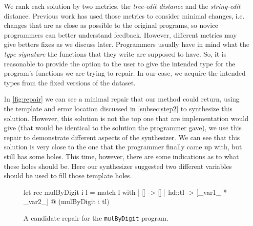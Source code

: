  We rank each solution by two metrics, the \emph{tree-edit distance} and the \emph{string-edit}
distance. Previous work has used those metrics to consider minimal changes, i.e. changes that are as close as possible
to the original programs, so novice programmers can better understand feedback. However, different metrics may give
betters fixes as we discuss later. Programmers usually have in mind what the \emph{type signature} the functions that
they write are supposed to have. So, it is reasonable to provide the option to the user to give the intended type for
the program's functions we are trying to repair. In our case, we acquire the intended types from the fixed versions of
the dataset.

 In \autoref{fig:repair} we can see a minimal repair that our method could return, using the template
and error location discussed in \autoref{subsec:step2} to synthesize this solution. However, this solution is not the
top one that are implementation would give (that would be identical to the solution the programmer gave), we use this
repair to demonstrate different aspects of the synthesizer. We can see that this solution is very close to the one that
the programmer finally came up with, but still has some holes. This time, however, there are some indications as to what
these holes should be. Here our synthesizer suggested two different variables should be used to fill those template
holes.

\begin{figure}[ht]
  \begin{ecode}
    let rec mulByDigit i l =
      match l with
      | []     -> []
      | hd::tl -> [_var1_ * _var2_] @ (mulByDigit i tl)
  \end{ecode}
  \caption{A candidate repair for the \texttt{mulByDigit} program.}
  \label{fig:repair}
\end{figure}
